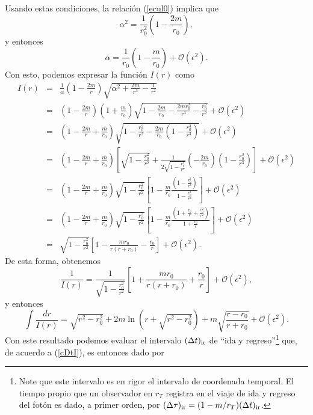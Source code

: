 Usando estas condiciones, la relación (\ref{ecul0}) implica que
\begin{equation}
 \alpha^2=\frac{1}{r^2_0}\left(1-\frac{2m}{r_0}\right),
\end{equation}
y entonces
\begin{equation}
\alpha=\frac{1}{r_0}\left(1-\frac{m}{r_0}\right)+\mathcal{O}(\epsilon^2).
\end{equation}
Con esto, podemos expresar la función $I(r)$ como
\begin{eqnarray}
 I(r)&=&\frac{1}{\alpha}\left(1-\frac{2m}{r}\right)\sqrt{\alpha^2+\frac{2m}{r^3}-\frac{1}{r^2}} \\
&=&\left(1-\frac{2m}{r}\right)\left(1+\frac{m}{r_0}\right)\sqrt{1-\frac{2m}{r_0}-\frac{2mr_0^2}{r^3}-\frac{r_0^2}{r^2}} +\mathcal{O}(\epsilon^2)\\
&=&\left(1-\frac{2m}{r}+\frac{m}{r_0}\right)\sqrt{1-\frac{r_0^2}{r^2}-\frac{2m}{r_0}\left(1-\frac{r_0^3}{r^3}\right)}+\mathcal{O}(\epsilon^2) \\
&=&\left(1-\frac{2m}{r}+\frac{m}{r_0}\right)\left[\sqrt{1-\frac{r_0^2}{r^2}}+\frac{1}{2\sqrt{1-\frac{r_0^2}{r^2}}}\left(-\frac{2m}{r_0}\right)\left(1-\frac{r_0^3}{r^3}\right)\right] +\mathcal{O}(\epsilon^2)\\
&=&\left(1-\frac{2m}{r}+\frac{m}{r_0}\right)\sqrt{1-\frac{r_0^2}{r^2}}\left[1-\frac{m}{r_0}\frac{\left(1-\frac{r_0^3}{r^3}\right)}{1-\frac{r_0^2}{r^2}}\right] +\mathcal{O}(\epsilon^2)\\
&=&\left(1-\frac{2m}{r}+\frac{m}{r_0}\right)\sqrt{1-\frac{r_0^2}{r^2}}\left[1-\frac{m}{r_0}\frac{\left(1+\frac{r_0}{r}+\frac{r_0^2}{r^2}\right)}{1+\frac{r_0}{r}}\right]+\mathcal{O}(\epsilon^2) \\
&=&\sqrt{1-\frac{r_0^2}{r^2}}\left[1-\frac{mr_0}{r(r+r_0)}-\frac{r_0}{r}\right]+\mathcal{O}(\epsilon^2).
\end{eqnarray}
De esta forma, obtenemos
\begin{equation}
 \frac{1}{I(r)}=\frac{1}{\sqrt{1-\frac{r_0^2}{r^2}}}\left[1+\frac{mr_0}{r(r+r_0)}+\frac{r_0}{r}\right]+\mathcal{O}(\epsilon^2),
\end{equation}
y entonces
\begin{equation}
 \int\frac{dr}{I(r)}=\sqrt{r^2-r_0^2}+2m\ln\left(r+\sqrt{r^2-r_0^2}\right)+m\sqrt{\frac{r-r_0}{r+r_0}}+\mathcal{O}(\epsilon^2).
\end{equation}
Con este resultado podemos evaluar el intervalo $(\Delta t)_{\rm ir}$ de ``ida y regreso''\footnote{Note que este intervalo es en rigor el intervalo de coordenada temporal. El tiempo propio que un observador en $r_T$ registra en el viaje de ida y regreso del fotón es dado, a primer orden, por $(\Delta\tau)_{\rm ir}=(1-m/r_T)(\Delta t)_{\rm ir}$.} que, de acuerdo a (\ref{cDtI}), es entonces dado por
